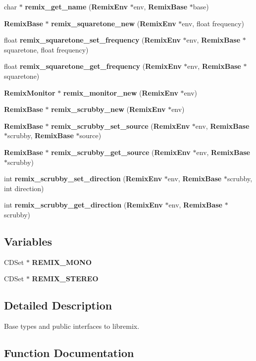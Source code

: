 \begin{DoxyCompactItemize}
\item 
char $\ast$ {\bf remix\_\-get\_\-name} ({\bf RemixEnv} $\ast$env, {\bf RemixBase} $\ast$base)
\item 
{\bf RemixBase} $\ast$ {\bf remix\_\-squaretone\_\-new} ({\bf RemixEnv} $\ast$env, float frequency)
\item 
float {\bf remix\_\-squaretone\_\-set\_\-frequency} ({\bf RemixEnv} $\ast$env, {\bf RemixBase} $\ast$squaretone, float frequency)
\item 
float {\bf remix\_\-squaretone\_\-get\_\-frequency} ({\bf RemixEnv} $\ast$env, {\bf RemixBase} $\ast$squaretone)
\item 
{\bf RemixMonitor} $\ast$ {\bf remix\_\-monitor\_\-new} ({\bf RemixEnv} $\ast$env)
\item 
{\bf RemixBase} $\ast$ {\bf remix\_\-scrubby\_\-new} ({\bf RemixEnv} $\ast$env)
\item 
{\bf RemixBase} $\ast$ {\bf remix\_\-scrubby\_\-set\_\-source} ({\bf RemixEnv} $\ast$env, {\bf RemixBase} $\ast$scrubby, {\bf RemixBase} $\ast$source)
\item 
{\bf RemixBase} $\ast$ {\bf remix\_\-scrubby\_\-get\_\-source} ({\bf RemixEnv} $\ast$env, {\bf RemixBase} $\ast$scrubby)
\item 
int {\bf remix\_\-scrubby\_\-set\_\-direction} ({\bf RemixEnv} $\ast$env, {\bf RemixBase} $\ast$scrubby, int direction)
\item 
int {\bf remix\_\-scrubby\_\-get\_\-direction} ({\bf RemixEnv} $\ast$env, {\bf RemixBase} $\ast$scrubby)
\end{DoxyCompactItemize}
\subsection*{Variables}
\begin{DoxyCompactItemize}
\item 
CDSet $\ast$ {\bf REMIX\_\-MONO}
\item 
CDSet $\ast$ {\bf REMIX\_\-STEREO}
\end{DoxyCompactItemize}


\subsection{Detailed Description}
Base types and public interfaces to libremix. 

\subsection{Function Documentation}
